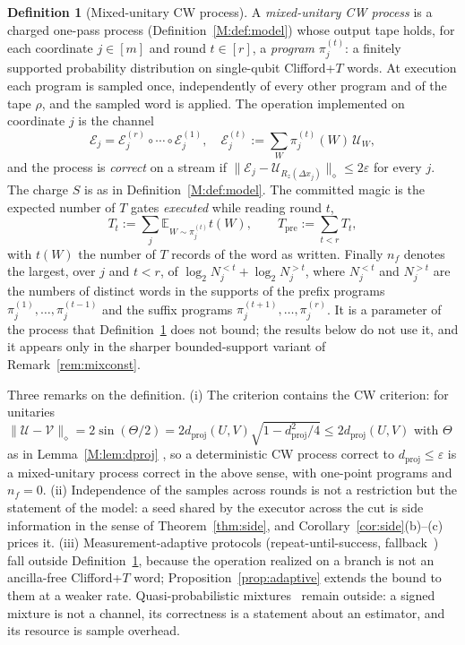 \documentclass[aps,prx,twocolumn,superscriptaddress,nofootinbib,longbibliography]{revtex4-2}
\theoremstyle{plain}
\theoremstyle{definition}
\newtheorem{definition}{Definition}
\theoremstyle{remark}
\newcommand{\dproj}{d_{\mathrm{proj}}}
\newcommand{\Tpre}{T_{\mathrm{pre}}}
\newcommand{\E}{\mathbb{E}}
\begin{document}
\begin{definition}[Mixed-unitary CW process]\label{def:mixed}
A \emph{mixed-unitary CW process} is a charged one-pass process (Definition~\ref{M:def:model}) whose output tape holds, for each coordinate $j\in[m]$ and round $t\in[r]$, a \emph{program} $\pi^{(t)}_j$: a finitely supported probability distribution on single-qubit Clifford+$T$ words. At execution each program is sampled once, independently of every other program and of the tape $\rho$, and the sampled word is applied. The operation implemented on coordinate $j$ is the channel
\begin{equation}
\mathcal E_j=\mathcal E^{(r)}_j\circ\cdots\circ\mathcal E^{(1)}_j,\quad
\mathcal E^{(t)}_j:=\sum_{W}\pi^{(t)}_j(W)\,\mathcal U_W,
\end{equation}
and the process is \emph{correct} on a stream if $\|\mathcal E_j-\mathcal U_{R_z(\Delta x_j)}\|_\diamond\le2\varepsilon$ for every $j$. The charge $S$ is as in Definition~\ref{M:def:model}. The committed magic is the expected number of $T$ gates \emph{executed} while reading round $t$,
\begin{equation}
T_t:=\sum_j\E_{W\sim\pi^{(t)}_j}t(W),\qquad\Tpre:=\sum_{t<r}T_t,
\end{equation}
with $t(W)$ the number of $T$ records of the word as written. Finally $n_f$ denotes the largest, over $j$ and $t<r$, of $\log_2N^{<t}_j+\log_2N^{>t}_j$, where $N^{<t}_j$ and $N^{>t}_j$ are the numbers of distinct words in the supports of the prefix programs $\pi^{(1)}_j,\dots,\pi^{(t-1)}_j$ and the suffix programs $\pi^{(t+1)}_j,\dots,\pi^{(r)}_j$. It is a parameter of the process that Definition~\ref{def:mixed} does not bound; the results below do not use it, and it appears only in the sharper bounded-support variant of Remark~\ref{rem:mixconst}.
\end{definition}

Three remarks on the definition. (i) The criterion contains the CW criterion: for unitaries $\|\mathcal U-\mathcal V\|_\diamond=2\sin(\Theta/2)=2\dproj(U,V)\sqrt{1-\dproj^2/4}\le2\dproj(U,V)$ with $\Theta$ as in Lemma~\ref{M:lem:dproj} \cite[Thm.~3.55]{Watrous}, so a deterministic CW process correct to $\dproj\le\varepsilon$ is a mixed-unitary process correct in the above sense, with one-point programs and $n_f=0$. (ii) Independence of the samples across rounds is not a restriction but the statement of the model: a seed shared by the executor across the cut is side information in the sense of Theorem~\ref{thm:side}, and Corollary~\ref{cor:side}(b)--(c) prices it. (iii) Measurement-adaptive protocols (repeat-until-success, fallback~\cite{BRS,KLMPP}) fall outside Definition~\ref{def:mixed}, because the operation realized on a branch is not an ancilla-free Clifford+$T$ word; Proposition~\ref{prop:adaptive} extends the bound to them at a weaker rate. Quasi-probabilistic mixtures~\cite{Bothe} remain outside: a signed mixture is not a channel, its correctness is a statement about an estimator, and its resource is sample overhead.
\end{document}
